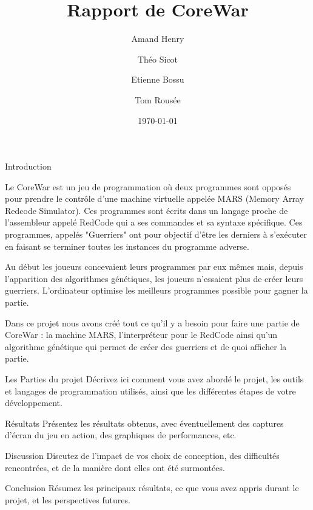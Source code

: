 \documentclass[a4paper, 10pt]{article}
\title{Rapport de CoreWar}
\author{Amand Henry\and{}Théo Sicot\and{}Etienne Bossu\and{}Tom Rousée}
\date{\today{}}
\begin{document}
    \maketitle{}
    \newpage{}
    \tableofcontents{}
    \newpage{}

    \begin{section}{Introduction} \label{sec:introduction}
        \par
            Le CoreWar est un jeu de programmation où deux programmes sont opposés pour prendre le contrôle d'une machine virtuelle appelée MARS (Memory Array Redcode Simulator). Ces programmes sont écrits dans un langage proche de l'assembleur appelé RedCode qui a ses commandes et sa syntaxe spécifique. Ces programmes, appelés "Guerriers" ont pour objectif d'être les derniers à s'exécuter en faisant se terminer toutes les instances du programme adverse.
            \medskip
        \par
            Au début les joueurs concevaient leurs programmes par eux mêmes mais, depuis l'apparition des algorithmes génétiques, les joueurs n'essaient plus de créer leurs guerriers. L'ordinateur optimise les meilleurs programmes possible pour gagner la partie.
            \bigskip
        \par
            Dans ce projet nous avons créé tout ce qu'il y a besoin pour faire une partie de CoreWar : la machine MARS, l'interpréteur pour le RedCode ainsi qu'un algorithme génétique qui permet de créer des guerriers et de quoi afficher la partie. 
    \end{section}

    \begin{section}{Les Parties du projet} \label{sec:methodologie}
        Décrivez ici comment vous avez abordé le projet, les outils et langages de programmation utilisés, ainsi que les différentes étapes de votre développement.
    \end{section}

    \begin{section}{Résultats}\label{sec:resultats}
        Présentez les résultats obtenus, avec éventuellement des captures d'écran du jeu en action, des graphiques de performances, etc.
    \end{section}

    \begin{section}{Discussion}\label{sec:discussion}
        Discutez de l'impact de vos choix de conception, des difficultés rencontrées, et de la manière dont elles ont été surmontées.
    \end{section}

    \begin{section}{Conclusion}\label{sec:conclusion}
        Résumez les principaux résultats, ce que vous avez appris durant le projet, et les perspectives futures.
    \end{section}

    
    
    
\end{document}
